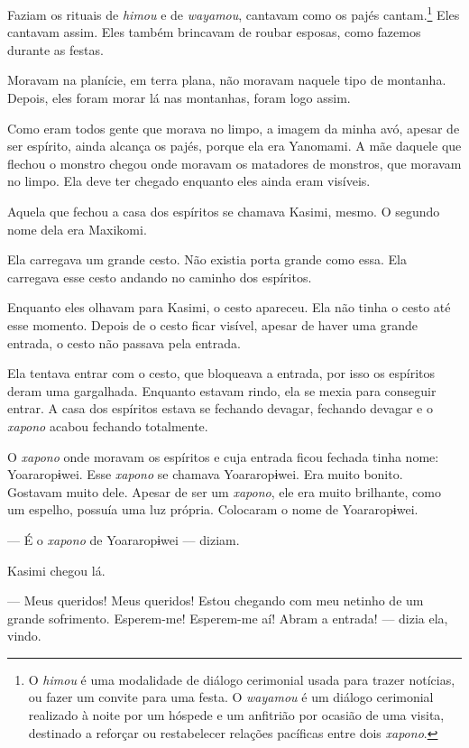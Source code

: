 Faziam os rituais de \textit{himou} e de \textit{wayamou}, cantavam como os
pajés cantam.\footnote{O \textit{himou} é uma modalidade de diálogo cerimonial usada para trazer notícias, ou fazer um convite para uma festa. O \textit{wayamou} é um diálogo cerimonial realizado à noite por um hóspede e um anfitrião por ocasião de uma visita, destinado a reforçar ou restabelecer relações pacíficas entre dois \textit{xapono}.} Eles cantavam assim. Eles também brincavam de roubar
esposas, como fazemos durante as festas. 

Moravam na planície, em terra plana, não moravam naquele tipo de
montanha. Depois, eles foram morar lá nas montanhas, foram logo assim. 

Como eram todos gente que morava no limpo, a imagem da minha avó, apesar
de ser espírito, ainda alcança os pajés, porque ela era Yanomami. A mãe
daquele que flechou o monstro chegou onde moravam os matadores de
monstros, que moravam no limpo. Ela deve ter chegado enquanto eles ainda
eram visíveis. 

Aquela que fechou a casa dos espíritos se chamava Kasimi, mesmo. O segundo nome dela era Maxikomi. 

Ela carregava um grande cesto. Não existia porta grande como essa. Ela
carregava esse cesto andando no caminho dos espíritos. 

Enquanto eles olhavam para Kasimi, o cesto apareceu. Ela não tinha
 o cesto até esse momento. Depois de o cesto ficar visível, apesar de
 haver uma grande entrada, o cesto não passava pela entrada.

Ela tentava entrar com o cesto, que bloqueava a entrada, por isso os
 espíritos deram uma gargalhada. Enquanto estavam rindo, ela se mexia
 para conseguir entrar. A casa dos espíritos estava se fechando devagar,
 fechando devagar e o \textit{xapono} acabou fechando totalmente. 

O \textit{xapono} onde moravam os espíritos e cuja entrada ficou fechada tinha
nome: Yoararopɨwei. Esse \textit{xapono} se chamava Yoararopɨwei. Era muito
bonito. Gostavam muito dele. Apesar de ser um \textit{xapono}, ele era muito
brilhante, como um espelho, possuía uma luz própria. Colocaram o nome de
Yoararopɨwei.

--- É o \textit{xapono} de Yoararopɨwei --- diziam. 

Kasimi chegou lá. 

--- Meus queridos! Meus queridos! Estou chegando com meu netinho de um
grande sofrimento. Esperem-me! Esperem-me aí! Abram a entrada! --- dizia ela,
vindo.

